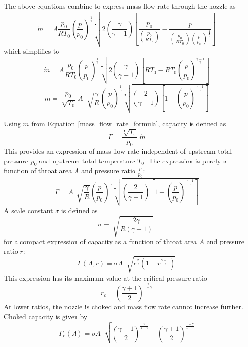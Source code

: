 \documentclass[a4paper, 11pt, twoside]{report}
\begin{document}
The above equations combine to express mass flow rate through the nozzle as
\begin{equation}
\dot{m} =
A
\frac{p_0}{R T_0}
\left(\frac{p}{p_0}\right)^\frac{1}{\gamma}
\sqrt[•]{ 
2 \left( \frac{\gamma}{\gamma - 1} \right) 
\left[ \frac{p_0}{ \left( \frac{p_0}{R T_0} \right) } - \frac{p}{ \left( \frac{p_0}{R T_0} \right) \left(\frac{p}{p_0}\right)^\frac{1}{\gamma} } \right] 
}
\end{equation}
which simplifies to
\begin{equation}
\dot{m} =
A
\frac{p_0}{R T_0}
\left(\frac{p}{p_0}\right)^\frac{1}{\gamma}
\sqrt[•]{
	2 \left( 
		\frac{\gamma}{\gamma - 1} 
	\right)
	\left[ 
		R T_0 - R T_0 \left( \frac{p}{p_0} \right)^\frac{\gamma-1}{\gamma} 
	\right]
}
\end{equation}
\begin{equation}\label{mass_flow_rate_formula}
\dot{m} =
\frac{p_0}{\sqrt[•]{T_0}} \>
A \;
\sqrt[]{\frac{\gamma}{R}}
\left(
    \frac{p}{p_0}
\right)^\frac{1}{\gamma}
\sqrt[•]{
	\left(
		\frac{2}{\gamma - 1}  
	\right)
	\left[
		1 - \left( \frac{p}{p_0} \right)^\frac{\gamma-1}{\gamma}
	\right] 
}
\end{equation}

Using $\dot{m}$ from Equation~\ref{mass_flow_rate_formula}, capacity is defined as
\begin{equation}\label{capacity_definition}
\Gamma = \frac{\sqrt[•]{T_0}}{p_0}  \>
\dot{m}
\end{equation}
This provides an expression of mass flow rate independent of upstream total pressure $p_0$ and upstream total temperature $T_0$. The expression is purely a function of throat area $A$ and pressure ratio $\frac{p}{p_0}$:
\begin{equation}
\Gamma =
A \;
\sqrt[]{\frac{\gamma}{R}}
\left(
    \frac{p}{p_0}
\right)^\frac{1}{\gamma}
\sqrt[•]{
	\left(
		\frac{2}{\gamma - 1}  
	\right)
	\left[
		1 - \left( \frac{p}{p_0} \right)^\frac{\gamma-1}{\gamma}
	\right] 
}
\end{equation}
A scale constant $\sigma$ is defined as
\begin{equation}
\sigma = 
\sqrt[]{\frac{2\gamma}{R\left(\gamma-1\right)}} \;
\end{equation}
for a compact expression of capacity as a function of throat area $A$ and pressure ratio $r$:
\begin{equation}
\Gamma \left( A, r \right) = 
\sigma
A \;
\sqrt[]{
	r^\frac{2}{\gamma}
	\left(
		1 - r ^\frac{\gamma-1}{\gamma}
	\right) 
}
\end{equation}
This expression has its maximum value at the critical pressure ratio
\begin{equation}
r_c =
\left(
	\frac{\gamma+1}{2}
\right)
^\frac{\gamma}{1-\gamma}
\end{equation}
At lower ratios, the nozzle is choked and mass flow rate cannot increase further. Choked capacity is given by
\begin{equation}\label{choked_capacity_from_area}
\Gamma_c \left( A \right) =
\sigma
A \;
\sqrt[]{
	\left(
		\frac{\gamma + 1}{2}  
	\right)
	^\frac{2}{1-\gamma}
	-
	\left(
		\frac{\gamma + 1}{2}  
	\right)
	^\frac{1+\gamma}{1-\gamma}
}
\end{equation}
\end{document}
